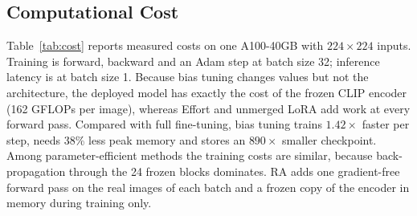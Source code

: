 \documentclass[fonts]{icst}
\begin{document}
\subsection{Computational Cost}
\label{sec:cost}
Table~\ref{tab:cost} reports measured costs on one A100-40GB with $224\times224$ inputs. Training is forward, backward and an Adam step at batch size 32; inference latency is at batch size 1. Because bias tuning changes values but not the architecture, the deployed model has exactly the cost of the frozen CLIP encoder (162 GFLOPs per image), whereas Effort and unmerged LoRA add work at every forward pass. Compared with full fine-tuning, bias tuning trains $1.42\times$ faster per step, needs 38\% less peak memory and stores an $890\times$ smaller checkpoint. Among parameter-efficient methods the training costs are similar, because back-propagation through the 24 frozen blocks dominates. RA adds one gradient-free forward pass on the real images of each batch and a frozen copy of the encoder in memory during training only.

\begin{table}[t]
\centering
\captionsetup{labelsep=period, labelfont=bf, hypcap=false}
\caption{Measured cost on an NVIDIA A100-40GB (fp32, $224\times224$). Train: batch 32, forward + backward + Adam step. Infer: batch 1. Ckpt: size of the stored trainable tensors.}
\label{tab:cost}
\end{table}
\end{document}
